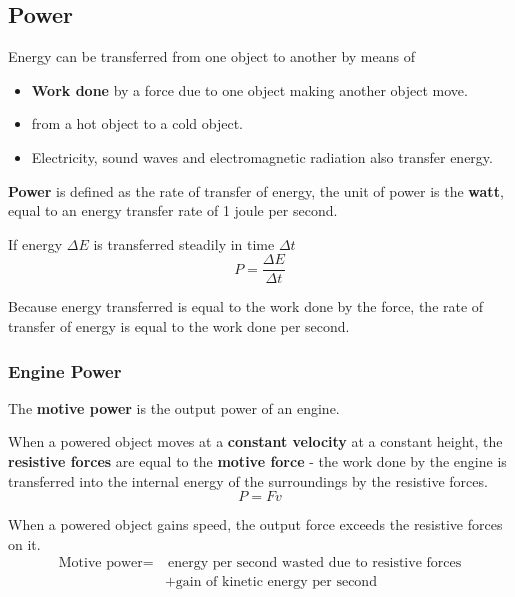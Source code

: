 \subsection{Power}

Energy can be transferred from one object to another by means of
\begin{itemize}
    \item \textbf{Work done} by a force due to one object making another object move.
    \item {} from a hot object to a cold object.
    \item Electricity, sound waves and electromagnetic radiation also transfer energy.
\end{itemize}

\textbf{Power} is defined as the rate of transfer of energy, the unit of power is the \textbf{watt}, equal to an energy transfer rate of 1 joule per second.

If energy $\Delta E$ is transferred steadily in time $\Delta t$
$$P=\frac{\Delta E}{\Delta t}$$

Because energy transferred is equal to the work done by the force, the rate of transfer of energy is equal to the work done per second.

\subsubsection*{Engine Power}

The \textbf{motive power} is the output power of an engine.

When a powered object moves at a \textbf{constant velocity} at a constant height, the \textbf{resistive forces} are equal to the \textbf{motive force} - the work done by the engine is transferred into the internal energy of the surroundings by the resistive forces.
$$P=Fv$$

When a powered object gains speed, the output force exceeds the resistive forces on it.
\begin{align*}
    \text{Motive power}=&\ \text{energy per second wasted due to resistive forces}\\
                        &+\text{gain of kinetic energy per second}
\end{align*}
